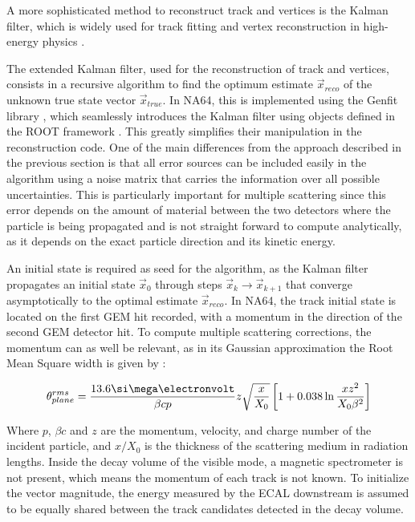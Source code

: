 A more sophisticated method to reconstruct track and vertices is the Kalman filter, which is widely used for track fitting and vertex reconstruction in high-energy physics \cite{HOPPNER2010518}.

The extended Kalman filter, used for the reconstruction of track and vertices, consists in a recursive algorithm to find the optimum estimate $\vec{x}_{reco}$ of the unknown true state vector $\vec{x}_{true}$. In NA64, this is implemented using the Genfit library \cite{genfit}, which seamlessly introduces the Kalman filter using objects defined in the ROOT framework \cite{root}. This greatly simplifies their manipulation in the reconstruction code. One of the main differences from the approach described in the previous section is that all error sources can be included easily in the algorithm using a noise matrix that carries the information over all possible uncertainties. This is particularly important for multiple scattering since this error depends on the amount of material between the two detectors where the particle is being propagated and is not straight forward to compute analytically, as it depends on the exact particle direction and its kinetic energy.

An initial state is required as seed for the algorithm, as the Kalman filter propagates an initial state $\vec{x}_0$ through steps $\vec{x}_k \rightarrow \vec{x}_{k+1}$ that converge asymptotically to the optimal estimate $\vec{x}_{reco}$. In NA64, the track initial state is located on the first GEM hit recorded, with a momentum in the direction of the second GEM detector hit. To compute multiple scattering corrections, the momentum can as well be relevant, as in its Gaussian approximation the Root Mean Square width is given by \cite{review-particle-physics}:

\begin{equation}
  \label{eq:mm-scattering}
  \theta_{plane}^{rms} = \frac{13.6 \mev}{\beta c p} z \sqrt{\frac{x}{X_0}} \left[ 1 + 0.038 \ln{\frac{x z^2}{X_0 \beta^2}} \right]
\end{equation}

Where $p$, $\beta c$ and $z$ are the momentum, velocity, and charge number of the incident particle, and $x/X_0$ is the thickness of the scattering medium in radiation lengths. Inside the decay volume of the visible mode, a magnetic spectrometer is not present, which means the momentum of each track is not known. To initialize the vector magnitude, the energy measured by the ECAL downstream is assumed to be equally shared between the track candidates detected in the decay volume.

